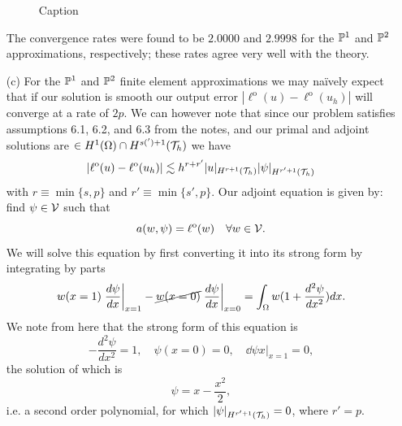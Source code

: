 \documentclass{article}
\begin{document}
\begin{itemize}
\begin{figure}[H]
		\caption{Caption}
		\label{fig:mms_l2}
	\end{figure}
	The convergence rates were found to be \(2.0000\) and \(2.9998\) for the \(\mathbb{P}^1 \) and \(\mathbb{P}^2 \) approximations, respectively; these rates agree very well with the theory.
	\item[(c)] For the \(\mathbb{P}^1 \) and \(\mathbb{P}^2 \) finite element approximations we may na\"ively expect that if our solution is smooth our output error \(|\ell^\text{o}(u) - \ell^\text{o}(u_h)| \) will converge at a rate of \(2p\). We can however note that since our problem satisfies assumptions 6.1, 6.2, and 6.3 from the notes, and our primal and adjoint solutions are \(\in H^1(\Omega) \cap H^{s(')+1}(\mathcal{T}_h) \) we have
	\begin{equation*}
		|\ell^\text{o}(u) - \ell^\text{o}(u_h)| \lesssim h^{r+r'}|u|_{H^{r+1}(\mathcal{T}_h)}|\psi|_{H^{r'+1}(\mathcal{T}_h)}
	\end{equation*}
	with \(r \equiv \min\{s,p\} \) and \(r' \equiv \min\{s',p\} \). Our adjoint equation is given by: find \(\psi \in \mathcal{V} \) such that 
	\begin{equation*}
		a(w,\psi) = \ell^\text{o}(w) \quad \forall w \in \mathcal{V}.
	\end{equation*}
	We will solve this equation by first converting it into its strong form by integrating by parts
	\begin{equation*}
		w(x=1)\left.\frac{d \psi}{d x}\right|_{x=1} - \cancel{w(x=0)}\left.\frac{d \psi}{d x}\right|_{x=0} = \int_\Omega w (1+\dfrac{d^2\psi}{dx^2})dx.
	\end{equation*}
	We note from here that the strong form of this equation is
	\begin{equation*}
		-\dfrac{d^2\psi}{dx^2} = 1, \quad \psi(x=0) = 0, \quad \left.\dd{\psi}{x}\right|_{x=1} = 0,
	\end{equation*}
	the solution of which is
	\begin{equation*}
		\psi = x - \dfrac{x^2}{2},
	\end{equation*}
	i.e. a second order polynomial, for which \(|\psi|_{H^{r'+1}(\mathcal{T}_h)} = 0 \), where \(r' = p \).
	

\end{itemize}
\end{document}
